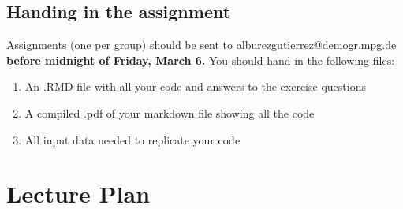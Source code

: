 ﻿\documentclass{article}
\begin{document}


\subsection{Handing in the assignment}

Assignments (one per group) should be sent to \href{mailto:alburezgutierrez@demogr.mpg.de}{alburezgutierrez@demogr.mpg.de} \textbf{before midnight of Friday, March 6.} 
You should hand in the following files:
\begin{enumerate}
    \item An .RMD file with all your code and answers to the exercise questions
    \item A compiled .pdf of your markdown file showing all the code
    \item All input data needed to replicate your code 
\end{enumerate}


\section{Lecture Plan}
\end{document}
